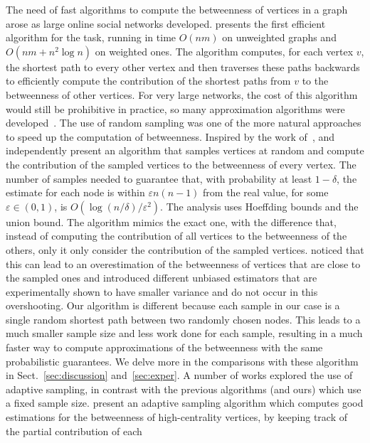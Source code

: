 The need of fast algorithms to compute the betweenness of vertices in a graph
arose as large online social networks developed. \citet{Brandes01} presents the
first efficient algorithm for the task, running in time $O(nm)$ on
unweighted graphs and $O(nm+n^2\log n)$ on weighted ones. The
algorithm computes, for each vertex $v$, the shortest path to every other vertex
and then traverses these paths backwards to efficiently compute the contribution
of the shortest paths from $v$ to the betweenness of other vertices. For very
large networks, the cost of this algorithm would still be prohibitive in
practice, so many approximation algorithms were
developed~\citep{JacobKLPT05,BrandesP07,BaderKMM07,GeisbergerSS08,MaiyaBW10,LimMRTB11}.
The use of random sampling was one of the more natural approaches to speed up
the computation of betweenness. Inspired by the work of~\citet{EppsteinW04},
\citet{JacobKLPT05} and independently \citet{BrandesP07} present an algorithm
that samples vertices at random and compute the contribution of the sampled
vertices to the betweenness of every vertex. The number of samples needed to
guarantee that, with probability at least $1-\delta$, the estimate for each node
is within $\varepsilon n(n-1)$ from the real value, for some
$\varepsilon\in(0,1)$, is $O(\log(n/\delta)/\varepsilon^2)$. The analysis uses
Hoeffding bounds\citep{Hoeffding63} and the union bound. The algorithm mimics
the exact one, with the difference that, instead of computing the contribution
of all vertices to the betweenness of the others, only it only consider the
contribution of the sampled vertices. \citet{GeisbergerSS08} noticed that this
can lead to an overestimation of the betweenness of vertices that are close to
the sampled ones and introduced different unbiased estimators that are
experimentally shown to have smaller variance and do not occur in this
overshooting. Our algorithm is different because each sample in our case is a
single random shortest path between two randomly chosen nodes. This leads to a
much smaller sample size and less work done for each sample, resulting in a much
faster way to compute approximations of the betweenness with the same
probabilistic guarantees. We delve more in the comparisons with these algorithm
in Sect.~\ref{sec:discussion} and~\ref{sec:exper}. A number of works explored
the use of adaptive sampling, in contrast with the previous algorithms (and
ours) which use a fixed sample size.  \citet{BaderKMM07} present an adaptive
sampling algorithm which computes good estimations for the betweenness of
high-centrality vertices, by keeping track of the partial contribution of each
